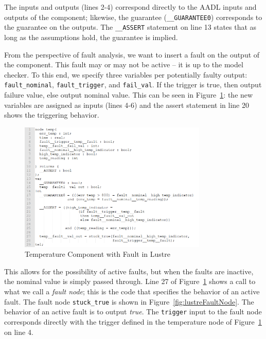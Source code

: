 The inputs and outputs (lines 2-4) correspond directly to the AADL inputs and outputs of the component; likewise, the guarantee (\texttt{\_\_GUARANTEE0}) corresponds to the guarantee on the outputs. The \texttt{\_\_ASSERT} statement on line 13 states that as long as the assumptions hold, the guarantee is implied. 

From the perspective of fault analysis, we want to insert a fault on the output of the component. This fault may or may not be active -- it is up to the model checker. To this end, we specify three variables per potentially faulty output: \texttt{fault\_nominal}, \texttt{fault\_trigger}, and \texttt{fail\_val}. If the trigger is true, then output failure value, else output nominal value. This can be seen in Figure~\ref{fig:lustreTempNodeFault}: the new variables are assigned as inputs (lines 4-6) and the assert statement in line 20 shows the triggering behavior.

\begin{figure}[h]
	\begin{center}
		\includegraphics[width=0.8\textwidth]{images/lustreTempNodeFault.png}
	\end{center}
	\caption{Temperature Component with Fault in Lustre}
	\label{fig:lustreTempNodeFault}
\end{figure}

This allows for the possibility of active faults, but when the faults are inactive, the nominal value is simply passed through. Line 27 of Figure~\ref{fig:lustreTempNodeFault} shows a call to what we call a {\em fault node}; this is the code that specifies the behavior of an active fault. The fault node \texttt{stuck\_true} is shown in Figure~\ref{fig:lustreFaultNode}. The behavior of an active fault is to output {\em true}. The \texttt{trigger} input to the fault node corresponds directly with the trigger defined in the temperature node of Figure~\ref{fig:lustreTempNodeFault} on line 4. 

